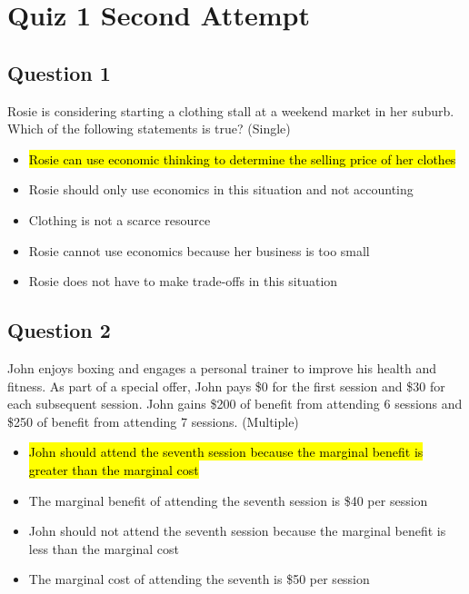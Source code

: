 \section{Quiz 1 Second Attempt}

\subsection{Question 1}
Rosie is considering starting a clothing stall at a weekend market in her suburb. Which of the following statements is true? (Single)
\begin{itemize}
	\item\hl{Rosie can use economic thinking to determine the selling price of her clothes}
	\item Rosie should only use economics in this situation and not accounting
	\item Clothing is not a scarce resource
	\item Rosie cannot use economics because her business is too small
	\item Rosie does not have to make trade-offs in this situation
\end{itemize}

\subsection{Question 2}
John enjoys boxing and engages a personal trainer to improve his health and fitness. As part of a special offer, John pays \$0 for the first session and \$30 for each subsequent session. John gains \$200 of benefit from attending 6 sessions and \$250 of benefit from attending 7 sessions. (Multiple)
\begin{itemize}
	\item\hl{John should attend the seventh session because the marginal benefit is greater than the marginal cost}
	\item The marginal benefit of attending the seventh session is \$40 per session
	\item John should not attend the seventh session because the marginal benefit is less than the marginal cost
	\item The marginal cost of attending the seventh is \$50 per session
\end{itemize}


